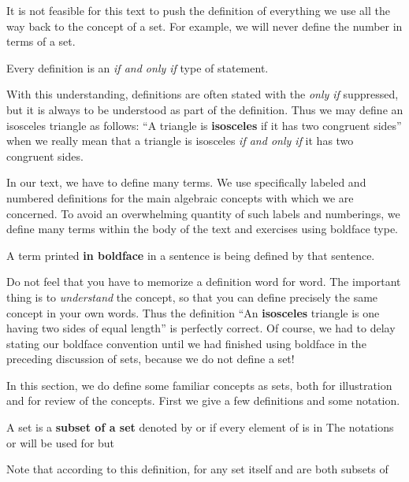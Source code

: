 \documentclass[11pt,oneside]{article}
\begin{document}
\begin{BookBody}

It is not feasible for this text to push the definition of everything we use all the way back to the concept of a set. For example, we will never define the number \BookInline{\pi } in terms of a set.

Every definition is an\textit{ if and only if} type of statement.

With this understanding, definitions are often stated with the\textit{ only if} suppressed, but it is always to be understood as part of the definition. Thus we may define an isosceles triangle as follows: “A triangle is\textbf{ isosceles} if it has two congruent sides” when we really mean that a triangle is isosceles\textit{ if and only if} it has two congruent sides.

In our text, we have to define many terms. We use specifically labeled and numbered definitions for the main algebraic concepts with which we are concerned. To avoid an overwhelming quantity of such labels and numberings, we define many terms within the body of the text and exercises using boldface type.


A term printed\textbf{ in boldface} in a sentence is being defined by that sentence.

Do not feel that you have to memorize a definition word for word. The important thing is to\textit{ understand} the concept, so that you can define precisely the same concept in your own words. Thus the definition “An\textbf{ isosceles} triangle is one having two sides of equal length” is perfectly correct. Of course, we had to delay stating our boldface convention until we had finished using boldface in the preceding discussion of sets, because we do not define a set!

In this section, we do define some familiar concepts as sets, both for illustration and for review of the concepts. First we give a few definitions and some notation.

 A set  is a\textbf{ subset of a set}  denoted by  or  if every element of  is in  The notations  or  will be used for  but \BookEnd{\blacksquare}

\noindent Note that according to this definition, for any set  itself and \BookInline{\emptyset } are both subsets of 


\end{BookBody}
\end{document}
